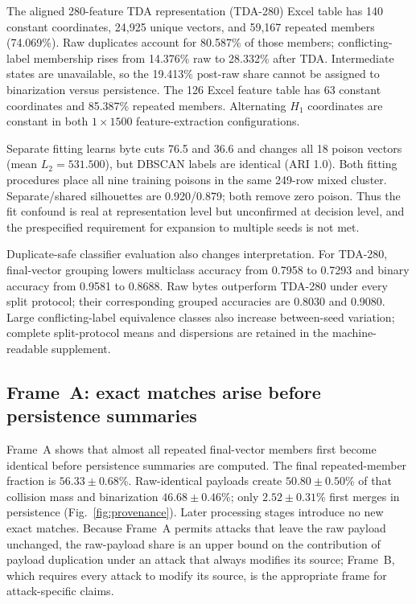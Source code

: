 \documentclass[conference]{IEEEtran}
\newcommand{\meanstd}[2]{#1\mathbin{\pm}#2}
\begin{document}
The aligned 280-feature TDA representation (TDA-280) Excel table has 140 constant coordinates, 24,925 unique
vectors, and 59,167 repeated members (74.069\%). Raw duplicates account for
80.587\% of those members; conflicting-label membership rises from 14.376\%
raw to 28.332\% after TDA. Intermediate states are unavailable, so the 19.413\%
post-raw share cannot be assigned to binarization versus persistence. The 126
Excel feature table has 63 constant coordinates and 85.387\% repeated members.
Alternating $H_1$ coordinates are constant in both $1\times1500$
feature-extraction configurations.

Separate fitting learns byte cuts 76.5 and 36.6 and changes all 18 poison
vectors (mean $L_2=531.500$), but DBSCAN labels are identical (ARI 1.0).
Both fitting procedures place all nine training poisons in the same 249-row mixed cluster.
Separate/shared silhouettes are 0.920/0.879; both remove zero poison. Thus the
fit confound is real at representation level but unconfirmed at decision level,
and the prespecified requirement for expansion to multiple seeds is not met.

Duplicate-safe classifier evaluation also changes interpretation. For TDA-280,
final-vector grouping lowers multiclass accuracy from 0.7958 to 0.7293 and
binary accuracy from 0.9581 to 0.8688. Raw bytes outperform TDA-280 under every
split protocol; their corresponding grouped accuracies are 0.8030 and 0.9080.
Large conflicting-label equivalence classes also increase between-seed
variation; complete split-protocol means and dispersions are retained in the
machine-readable supplement.

\subsection{Frame~A: exact matches arise before persistence summaries}
Frame~A shows that almost all repeated final-vector members first become
identical before persistence summaries are computed.
The final repeated-member fraction is $\meanstd{56.33}{0.68}$\%.
Raw-identical payloads create $\meanstd{50.80}{0.50}$\% of that collision mass
and binarization $\meanstd{46.68}{0.46}$\%; only
$\meanstd{2.52}{0.31}$\% first merges in persistence
(Fig.~\ref{fig:provenance}). Later processing stages introduce no new exact
matches. Because Frame~A permits attacks that leave the raw payload unchanged,
the raw-payload share is an upper bound on
the contribution of payload duplication under an attack that always modifies
its source; Frame~B, which requires every attack to modify its source, is the appropriate frame for
attack-specific claims.
\end{document}
